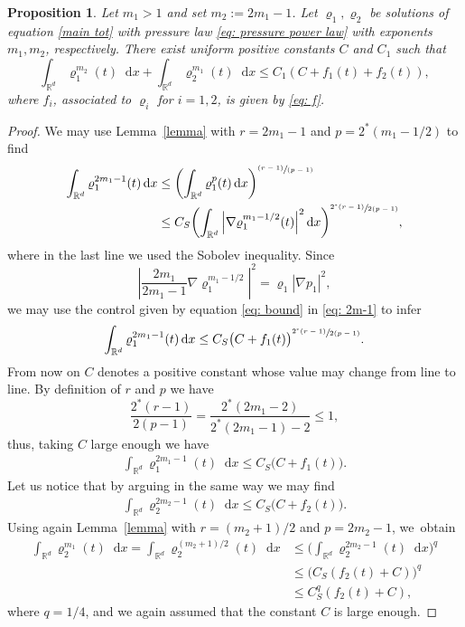 \documentclass[JEP,XML,SOM,Unicode,published]{cedram}
\newcommand{\pspfrac}[2]{\sfrac{(#1)}{(#2)}}
\newcommand{\bprt}[1]{\bigl(#1\bigr)}
\newcommand{\bbprt}[1]{\biggl(#1\biggr)}
\newcommand{\dx}[1]{\mathop{}\!\mathrm{d} #1}
\newcommand{\R}{\mathbb{R}}
\theoremstyle{plain}
\newtheorem{proposition}[theorem]{Proposition}
\theoremstyle{remark}
\begin{document}
\begin{proposition}\label{prop: bounds of powers}
Let $m_{1}>1$ and set $m_2:=2m_1-1$. Let $\varrho_1, \varrho_2$ be solutions of equation \eqref{main tot} with pressure law \eqref{eq: pressure power law} with exponents $m_1,m_2$, respectively. There exist uniform positive constants $C$ and $C_1$ such that
\begin{equation*}
\int_{\R^d} \varrho_1^{m_2}(t) \dx x + \int_{\R^d} \varrho_2^{m_1}(t) \dx x \leq C_1(C + f_1(t)+f_2(t)),
\end{equation*}
where $f_i$, associated to $\varrho_i$ for $i=1,2$, is given by \eqref{eq: f}.
\end{proposition}

\begin{proof}
We may use Lemma~\ref{lemma} with $r=2m_1-1$ and $p=2^*(m_1 - 1/2)$ to find
\begin{equation}\label{eq: 2m-1}
\begin{aligned}
\int_{\R^d} \varrho_1^{2m_1-1}(t) \dx x &\leq \bbprt{\int_{\R^d} \varrho_1^{p}(t) \dx x}^{\pspfrac{r-1}{p-1}}\\
&\leq C_S \bbprt{\int_{\R^d} \left|\nabla \varrho_1^{m_1-1/2}(t)\right|^2 \dx x}^{\sfrac{2^*(r-1)}{2(p-1)}},
\end{aligned}
\end{equation}
where in the last line we used the Sobolev inequality.
Since
\begin{equation*}
\left|\frac{2m_{1}}{2{m_{1}}-1}\nabla \varrho_1^{m_1-1/2}\right|^2 = \varrho_1\left|\nabla p_1\right|^2,
\end{equation*}
we may use the control given by equation \eqref{eq: bound} in \eqref{eq: 2m-1} to infer
\begin{align*}
\int_{\R^d} \varrho_1^{2m_1-1}(t) \dx x \leq C_S\bprt{C+ {f_{1}}(t)}^{\sfrac{2^*(r-1)}{2(p-1)}}.
\end{align*}
From now on $C$ denotes a positive constant whose value may change from line to line. By definition of $r$ and $p$ we have
\begin{equation*}
\frac{2^*(r-1)}{2(p-1)}= \frac{2^* (2m_1 -2)}{2^* (2m_1 - 1) -2} \leq 1,
\end{equation*}
thus, taking $C$ large enough we have
\begin{align*}
\int_{\R^d} \varrho_1^{2 m_1-1}(t) \dx x \leq C_S\bprt{C+ {f_{1}}(t)}.
\end{align*}
Let us notice that by arguing in the same way we may find
\begin{align*}
\int_{\R^d} \varrho_2^{2 m_2-1}(t) \dx x \leq C_S\bprt{C+ {f_{2}}(t)}.
\end{align*}
Using again Lemma~\ref{lemma} with $r=(m_2+1)/2$ and $p=2m_2-1$, we~obtain
\begin{align*}
\int_{\R^d} \varrho_2^{m_1}(t) \dx x = \int_{\R^d} \varrho_2^{(m_2+1)/2}(t) \dx x
&\leq \bbprt{\int_{\R^d} \varrho_2^{2m_2-1}(t) \dx x }^{q}\\
&\leq \bprt{C_S({f_{2}}(t)+C)}^q\\
&\leq C_S^q({f_{2}}(t)+C),
\end{align*}
where $q=1/4$, and we again assumed that the constant $C$ is large enough.
\end{proof}
\end{document}
